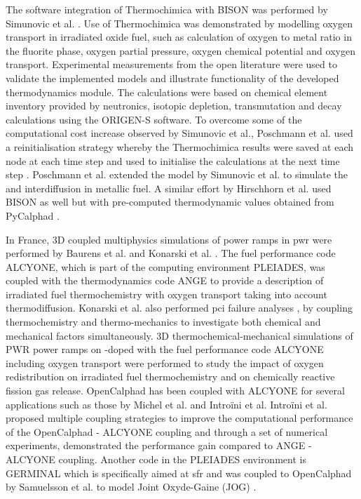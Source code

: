 	The software integration of Thermochimica with BISON was performed by Simunovic et al. \cite{Simunovic:2020aa}. Use of Thermochimica was demonstrated by modelling oxygen transport in irradiated  oxide fuel, such as calculation of oxygen to metal ratio in the fluorite phase, oxygen partial pressure, oxygen chemical potential and oxygen transport. Experimental measurements from the open literature were used to validate the implemented models and illustrate functionality of the developed thermodynamics module. The calculations were based on chemical element inventory provided by neutronics, isotopic depletion, transmutation and decay calculations using the ORIGEN-S software\cite{SCALE05}. To overcome some of the computational cost increase observed by Simunovic et al., Poschmann et al. used a reinitialisation strategy whereby the Thermochimica results were saved at each node at each time step and used to initialise the calculations at the next time step \cite{Poschmann:2019aa}. Poschmann et al. \cite{Poschmann:2021aa} extended the model by  Simunovic et al. to simulate the  and  interdiffusion in  metallic fuel. A similar effort by Hirschhorn et al. used BISON as well but with pre-computed thermodynamic values obtained from PyCalphad \cite{Hirschhorn:2021aa}. 

	In France, 3D coupled multiphysics simulations of power ramps in \gls{pwr} were performed by Baurens et al. \cite{Baurens:2014aa} and  Konarski et al. \cite{KONARSKI2019104}. The fuel performance code {ALCYONE}, which is part of the computing environment {PLEIADES}, was coupled with the thermodynamics code {ANGE} to provide a description of irradiated fuel thermochemistry with oxygen transport taking into account thermodiffusion. Konarski et al. also performed \gls{pci} failure analyses \cite{Piro:2020aa}, by coupling thermochemistry and thermo-mechanics to investigate both chemical and mechanical factors simultaneously. 3D thermochemical-mechanical simulations of PWR power ramps on -doped  with the fuel performance code {ALCYONE} including oxygen transport were performed to study the impact of oxygen redistribution on irradiated fuel thermochemistry and on chemically reactive fission gas release. OpenCalphad has been coupled with ALCYONE for several applications such as those by Michel et al. \cite{Michel:2013aa} and Intro\"{i}ni et al. Intro\"{i}ni et al. proposed multiple coupling strategies to improve the computational performance of the OpenCalphad - ALCYONE coupling and through a set of numerical experiments, demonstrated the performance gain compared to ANGE - ALCYONE coupling. Another code in the PLEIADES environment is GERMINAL which is specifically aimed at \gls{sfr} and was coupled to OpenCalphad by Samuelsson et al. \cite{Samuelsson-Karl:2020aa} to model Joint Oxyde-Gaine (JOG) \cite{Gueneau:2020aa}.
	
